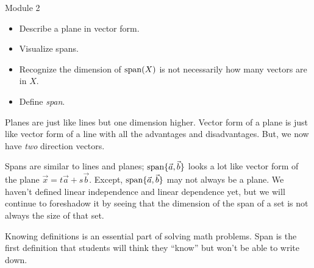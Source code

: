 \documentclass{workbook}
\begin{document}
\begin{lesson}

	Module 2

	\begin{itemize}
		\item Describe a plane in vector form.
		\item Visualize spans.
		\item Recognize the dimension of $\operatorname{span}(X)$ is not necessarily how many vectors
			are in $X$.
		\item Define \emph{span}.
	\end{itemize}

	Planes are just like lines but one dimension higher. Vector form of a plane is just like
	vector form of a line with all the advantages and disadvantages. But, we now have
	\emph{two} direction vectors.

	Spans are similar to lines and planes; $\operatorname{span}\{\vec a,\vec b\}$ looks a lot like
	vector form of the plane
	$\vec x=t\vec a+s\vec b$. Except, $\operatorname{span}\{\vec a,\vec b\}$ may not always be a plane.
	We haven't defined linear independence and linear dependence yet, but we will continue to
	foreshadow it by seeing that the dimension of the span of a set is not always the size of
	that set.

	Knowing definitions is an essential part of solving math problems. Span is
	the first definition that students will think they ``know'' but won't be
	able to write down.

\end{lesson}
\end{document}
